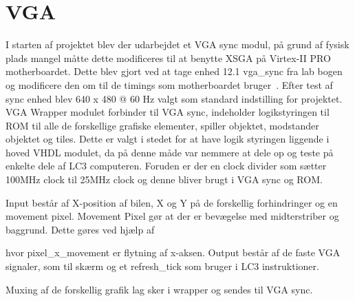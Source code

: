 \section{VGA}
I starten af projektet blev der udarbejdet et VGA sync modul, på grund af fysisk plads mangel måtte dette modificeres til at benytte XSGA på Virtex-II PRO motherboardet. Dette blev gjort ved at tage enhed 12.1 vga\_sync fra lab bogen~\cite{chu} og modificere den om til de timings som motherboardet bruger~\cite{hardwaremanual tabel 2-6 side 37}.
Efter test af sync enhed blev 640 x 480 @ 60 Hz valgt som standard indstilling for projektet.
VGA Wrapper modulet forbinder til VGA sync, indeholder logikstyringen til ROM til alle de forskellige grafiske elementer, spiller objektet, modstander objektet og tiles. Dette er valgt i stedet for at have logik styringen liggende i hoved VHDL modulet, da på denne måde var nemmere at dele op og teste på enkelte dele af LC3 computeren. Foruden er der en clock divider som sætter 100MHz clock til 25MHz clock og denne bliver brugt i VGA sync og ROM. 

Input består af X-position af bilen, X og Y på de forskellig forhindringer og en movement pixel. Movement Pixel gør at der er bevægelse med midterstriber og baggrund.
Dette gøres ved hjælp af 

hvor pixel\_x\_movement er flytning af x-aksen.
Output består af de faste VGA signaler, som til skærm og et refresh\_tick som bruger i LC3 instruktioner. 

Muxing af de forskellig grafik lag sker i wrapper og sendes til VGA sync.